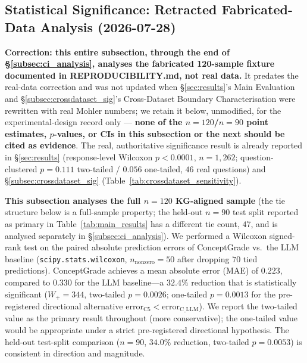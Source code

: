 \documentclass[conference]{IEEEtran}
\begin{document}
\subsection{Statistical Significance: Retracted Fabricated-Data Analysis (2026-07-28)}
\label{subsec:significance}

\textbf{Correction: this entire subsection, through the end of
\S\ref{subsec:ci_analysis}, analyses the fabricated 120-sample fixture
documented in REPRODUCIBILITY.md, not real data.} It predates the
real-data correction and was not updated when \S\ref{sec:results}'s
Main Evaluation and \S\ref{subsec:crossdataset_sig}'s Cross-Dataset
Boundary Characterisation were rewritten with real Mohler numbers; we
retain it below, unmodified, for the experimental-design record only ---
\textbf{none of the $n=120$/$n=90$ point estimates, $p$-values, or CIs
in this subsection or the next should be cited as evidence}. The real,
authoritative significance result is already reported in
\S\ref{sec:results} (response-level Wilcoxon $p<0.0001$, $n=1{,}262$;
question-clustered $p=0.111$ two-tailed / $0.056$ one-tailed, $46$ real
questions) and \S\ref{subsec:crossdataset_sig} (Table~\ref{tab:crossdataset_sensitivity}).

\textbf{This subsection analyses the full $n=120$ KG-aligned sample}
(the tie structure below is a full-sample property; the held-out $n=90$
test split reported as primary in Table~\ref{tab:main_results} has a
different tie count, $47$, and is analysed separately in
\S\ref{subsec:ci_analysis}). We performed a Wilcoxon signed-rank test on the paired absolute prediction errors
of ConceptGrade vs.\ the LLM baseline (\texttt{scipy.stats.wilcoxon},
$n_{\text{nonzero}} = 50$ after dropping $70$ tied predictions). ConceptGrade
achieves a mean absolute error (MAE) of $0.223$, compared to $0.330$ for the LLM
baseline---a $32.4\%$ reduction that is statistically significant
($W_+ = 344$, two-tailed $p = 0.0026$; one-tailed $p = 0.0013$ for the
pre-registered directional alternative $\text{error}_{\text{C5}} <
\text{error}_{\text{C\_LLM}}$). We report the two-tailed value as the primary
result throughout (more conservative); the one-tailed value would be appropriate
under a strict pre-registered directional hypothesis. The held-out test-split
comparison ($n=90$, $34.0\%$ reduction, two-tailed $p=0.0053$) is consistent
in direction and magnitude.
\end{document}
